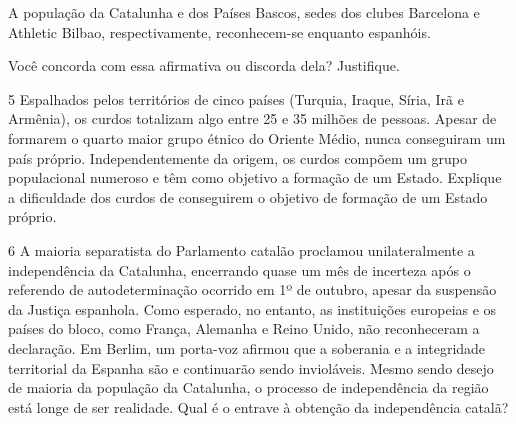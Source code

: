 A população da Catalunha e dos Países Bascos, sedes dos clubes Barcelona
e Athletic Bilbao, respectivamente, reconhecem-se enquanto espanhóis.

Você concorda com essa afirmativa ou discorda dela? Justifique.


\num{5} Espalhados pelos territórios de cinco países (Turquia, Iraque,
Síria, Irã e Armênia), os curdos totalizam algo entre 25 e 35 milhões de
pessoas. Apesar de formarem o quarto maior grupo étnico do Oriente
Médio, nunca conseguiram um país próprio. Independentemente da origem,
os curdos compõem um grupo populacional numeroso e têm como objetivo a
formação de um Estado. Explique a dificuldade dos curdos de conseguirem
o objetivo de formação de um Estado próprio.


\num{6} A maioria separatista do Parlamento catalão proclamou
unilateralmente a independência da Catalunha, encerrando quase um mês de
incerteza após o referendo de autodeterminação ocorrido em 1º de
outubro, apesar da suspensão da Justiça espanhola. Como esperado, no
entanto, as instituições europeias e os países do bloco, como França,
Alemanha e Reino Unido, não reconheceram a declaração. Em Berlim, um
porta-voz afirmou que a soberania e a integridade territorial da Espanha
são e continuarão sendo invioláveis. Mesmo sendo desejo de maioria da
população da Catalunha, o processo de independência da região está longe
de ser realidade. Qual é o entrave à obtenção da independência catalã?

